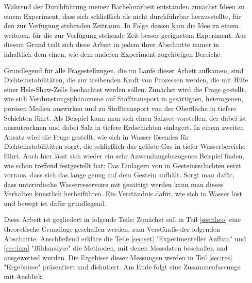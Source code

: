 
\label{sec:intro}

Während der Durchführung meiner Bachelorarbeit entstanden zunächst Ideen zu einem Experiment, dass sich schließlich als nicht durchführbar herausstellte, für den zur 
Verfügung stehenden Zeitraum. In Folge dessen kam die Idee zu einem weiteren, für die zur Verfügung stehende Zeit besser geeignetem Experiment. Aus diesem Grund teilt
sich diese Arbeit in jedem ihrer Abschnitte immer in inhaltlich dem einen, wie dem anderen Experiment zugehörigen Bereiche.

Grundlegend für alle Fragestellungen, die im Laufe dieser Arbeit aufkamen, sind Dichteinstabilitäten, die zur treibenden Kraft von Prozessen werden, die mit Hilfe
einer Hele-Shaw-Zelle beobachtet werden sollen.
Zunächst wird die Frage gestellt, wie sich Verdunstungsphänomene auf Stofftransport in gesättigten, heterogenen, porösen Medien auswirken und zu Stofftransport 
von der Oberfläche in tiefere Schichten führt. Als Beispiel kann man sich einen Salzsee vorstellen, der dabei ist auszutrocknen und dabei Salz in tiefere Erdschichten
einlagert.
In einem zweiten Ansatz wird die Frage gestellt, wie sich in Wasser lösendes \COT für Dichteinstabilitäten sorgt, die schließlich das gelöste Gas in tiefer Wasserbereiche 
führt. Auch hier lässt sich wieder ein sehr Anwendungsbezogenes Beispiel finden, wie schon \cite{fernandez} treffend festgestellt hat: Das Einlagern von \COT in
Gesteinsschichten setzt vorraus, dass sich das \COT lange genug auf dem Gestein aufhält. Sorgt man dafür, dass unterirdische Wasserreservoirs mit \COT gesättigt werden
kann man dieses Verhalten künstlich herbeiführen. Ein Verständnis dafür, wie sich \COT in Wasser löst und bewegt ist dafür grundlegend.

Diese Arbeit ist gegliedert in folgende Teile: Zunächst soll in Teil \ref{sec:theo} eine theoretische Grundlage geschaffen werden, zum Verständis der folgenden Abschnitte.
Anschließend erkläre die Teile \ref{sec:set} "Experimenteller Aufbau" und \ref{sec:ima} "Bildanalyse" die Methoden, mit denen Messdaten beschaffen und ausgewerted wurden.
Die Ergebisse dieser Messungen werden in Teil \ref{sec:res} "Ergebnisse" präsentiert und diskutiert.
Am Ende folgt eine Zusammenfassunge mit Ausblick.